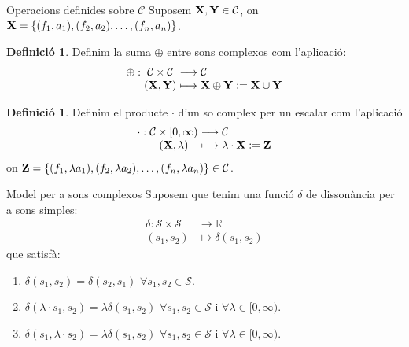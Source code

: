 \documentclass[10pt,hyperref={colorlinks,linkcolor=black,citecolor=blue!80,urlcolor=blue!60}]{beamer} %
\theoremstyle{definition}
\newtheorem{defin}[theorem]{Definició}
\newcommand{\0}{\ensuremath{\vb{0}}}
\newcommand{\X}{\ensuremath{\vb{X}}}
\newcommand{\Y}{\ensuremath{\vb{Y}}}
\newcommand{\Z}{\ensuremath{\vb{Z}}}
\newcommand{\RR}{\ensuremath{\mathbb{R}}} %
\begin{document}
\begin{frame}{Operacions definides sobre $\mathcal{C}$}
    Suposem $\X,\Y\in\mathcal{C}$, on $\X=\{(f_1,a_1),(f_2,a_2),\ldots,(f_n,a_n)\}$.\par\pause
    \begin{defin}
        Definim la suma $\oplus$ entre sons complexos com l'aplicació:
        $$\begin{array}{r@{\hspace{0.5\tabcolsep}}c@{\hspace{0.5\tabcolsep}}c@{\hspace{0.5\tabcolsep}}l}
            \oplus:&\mathcal{C}\times\mathcal{C}&\longrightarrow&\mathcal{C}\\
            &(\X,\Y)&\longmapsto&\X\oplus \Y:=\X\cup\Y
        \end{array}$$
    \end{defin}\pause
    \begin{defin}
        Definim el producte $\cdot$ d'un so complex per un escalar com l'aplicació
        $$\begin{array}{r@{\hspace{0.5\tabcolsep}}c@{\hspace{0.5\tabcolsep}}c@{\hspace{0.5\tabcolsep}}l}
            \cdot:&\mathcal{C}\times[0,\infty)&\longrightarrow&\mathcal{C}\\
            &(\X,\lambda)&\longmapsto&\lambda\cdot \X:=\Z
        \end{array}$$
        on $\Z=\{(f_1,\lambda a_1),(f_2,\lambda a_2),\ldots,(f_n,\lambda a_n)\}\in\mathcal{C}$.
    \end{defin}  
\end{frame}
\begin{frame}{Model per a sons complexos}
    Suposem que tenim una funció $\delta$ de dissonància per a sons simples:
    \begin{align*}
        \delta:\mathcal{S}\times\mathcal{S}&\longrightarrow\RR\\
        (s_1,s_2)&\longmapsto\delta(s_1,s_2)
    \end{align*}
    que satisfà:
    \begin{enumerate}
        \item $\delta(s_1,s_2)=\delta(s_2,s_1)$ $\forall s_1,s_2\in\mathcal{S}$.\pause
        \item $\delta(\lambda\cdot s_1,s_2)=\lambda\delta(s_1,s_2)$ $\forall s_1,s_2\in\mathcal{S}$ i $\forall\lambda\in[0,\infty)$.\pause
        \item $\delta(s_1,\lambda\cdot s_2)=\lambda\delta(s_1,s_2)$ $\forall s_1,s_2\in\mathcal{S}$ i $\forall \lambda\in[0,\infty)$.
    \end{enumerate}
\end{frame}
\end{document}
